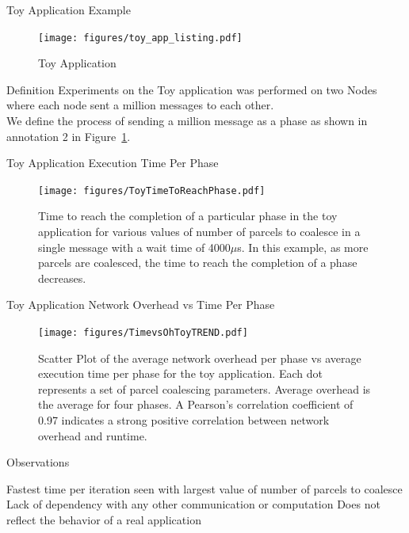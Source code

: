 \documentclass[10pt]{beamer}
\begin{document}
\begin{frame}{Toy Application Example}
\begin{figure}
	\centering
\texttt{[image: figures/toy\_app\_listing.pdf]}
\caption{{Toy Application}}
\label{toy_app}
\end{figure}
\end{frame}

\begin{frame}{Definition}
Experiments on the Toy application was performed on two Nodes where each node sent a million messages to each other.\\
We define the process of sending a million message as a phase as shown in annotation 2 in Figure~\ref{toy_app}.
\end{frame}

\begin{frame}{Toy Application Execution Time Per Phase}
\begin{figure}
	\centering
	\texttt{[image: figures/ToyTimeToReachPhase.pdf]}
	\caption{{Time to reach the completion of a particular phase in the toy application for various values of number of parcels to coalesce in a single message with a wait time of 4000$\mu$s. In this example, as more parcels are coalesced, the time to reach the completion of a phase decreases.}}
	\label{figureToyETOHNM}
\end{figure}
\end{frame}

\begin{frame}{Toy Application Network Overhead vs Time Per Phase}
\begin{figure}
	\centering
	\texttt{[image: figures/TimevsOhToyTREND.pdf]}
	\caption{{Scatter Plot of the average network overhead per phase vs average execution time per phase for the toy application. Each dot represents a set of parcel coalescing parameters. Average overhead is the average for four phases.  A Pearson's correlation coefficient of 0.97 indicates a strong positive correlation between network overhead and runtime. }}
	\label{figureETVSOH}
\end{figure}
\end{frame}

\begin{frame}{Observations}
\begin{outline}
	\1 Fastest time per iteration seen with largest value of number of parcels to coalesce 
	\2 Lack of dependency with any other communication or computation
	\1 Does not reflect the behavior of a real application
\end{outline}
\end{frame}
\end{document}
